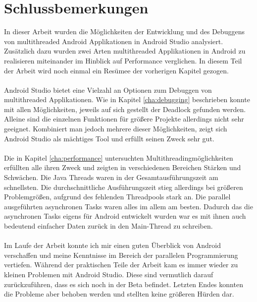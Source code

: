 \chapter[Schlussbemerkungen] {Schlussbemerkungen}       
\label{cha:schluss}

In dieser Arbeit wurden die Möglichkeiten der Entwicklung und des Debuggens von multithreaded Android Applikationen in Android Studio analysiert. Zusätzlich dazu wurden zwei Arten multithreaded Applikationen in Android zu realisieren miteinander im Hinblick auf Performance verglichen. In diesem Teil der Arbeit wird noch einmal ein Resümee der vorherigen Kapitel gezogen.
\\
\\
Android Studio bietet eine Vielzahl an Optionen zum Debuggen von multithreaded Applikationen. Wie in Kapitel \ref{cha:debugging} beschrieben konnte mit allen Möglichkeiten, jeweils auf sich gestellt der Deadlock gefunden werden. Alleine sind die einzelnen Funktionen für größere Projekte allerdings nicht sehr geeignet. Kombiniert man jedoch mehrere dieser Möglichkeiten, zeigt sich Android Studio als mächtiges Tool und erfüllt seinen Zweck sehr gut.
\\
\\
Die in Kapitel \ref{cha:performance} untersuchten Multithreadingmöglichkeiten erfüllten alle ihren Zweck und zeigten in verschiedenen Bereichen Stärken und Schwächen. Die Java Threads waren in der Gesamtausführungszeit am schnellsten. Die durchschnittliche Ausführungszeit stieg allerdings bei größeren Problemgrößen, aufgrund des fehlenden Threadpools stark an. Die parallel ausgeführten asynchronen Tasks waren alles im allem am besten. Dadurch das die asynchronen Tasks eigens für Android entwickelt wurden war es mit ihnen auch bedeutend einfacher Daten zurück in den Main-Thread zu schreiben.
\\
\\
Im Laufe der Arbeit konnte ich mir einen guten Überblick von Android verschaffen und meine Kenntnisse im Bereich der parallelen Programmierung vertiefen. Während der praktischen Teile der Arbeit kam es immer wieder zu kleinen Problemen mit Android Studio. Diese sind vermutlich darauf zurückzuführen, dass es sich noch in der Beta befindet. Letzten Endes konnten die Probleme aber behoben werden und stellten keine größeren Hürden dar.